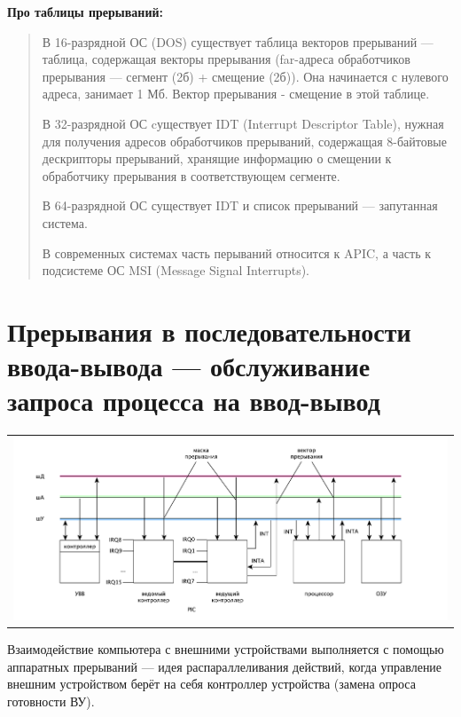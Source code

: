 \textbf{Про таблицы прерываний:}

\begin{quote}	
	В 16-разрядной ОС (DOS) существует таблица векторов прерываний --- таблица, содержащая векторы прерывания (far-адреса обработчиков прерывания --- сегмент (2б) + смещение (2б)). Она начинается с нулевого адреса, занимает 1 Мб. Вектор прерывания - смещение в этой таблице.
	
	В 32-разрядной ОС cуществует IDT (Interrupt Descriptor Table), нужная для получения адресов обработчиков прерываний, содержащая 8-байтовые дескрипторы прерываний, хранящие информацию о смещении к обработчику прерывания в соответствующем сегменте.
	
	В 64-разрядной ОС существует IDT и список прерываний --- запутанная система.
	
	В современных системах часть перываний относится к APIC, а часть к подсистеме ОС MSI (Message Signal Interrupts).
\end{quote}

\section{Прерывания в последовательности ввода-вывода --- обслуживание запроса процесса на ввод-вывод}

\begin{table}[h!]
  \centering
  \begin{tabular}{p{1\linewidth}}
    \centering
    \includegraphics[width=0.9\linewidth]{./images/buses.pdf}
  \end{tabular}
\end{table}

Взаимодействие компьютера с внешними устройствами выполняется с помощью аппаратных прерываний --- идея распараллеливания действий, когда управление внешним устройством берёт на себя контроллер устройства (замена опроса готовности ВУ).

